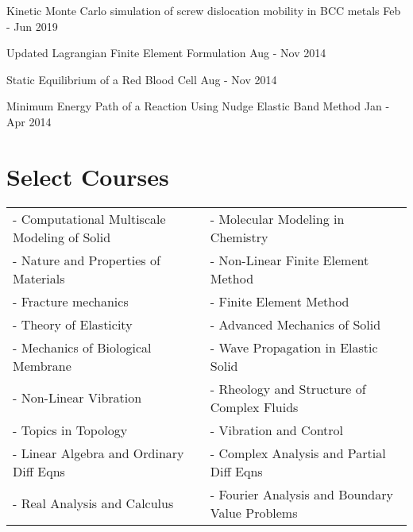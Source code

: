 \documentclass[margin,line]{resume}
\begin{document}
\begin{resume}
    Kinetic Monte Carlo simulation of screw dislocation mobility in BCC metals  \hfill \small{Feb - Jun 2019}

    \vspace{-0.3cm}
    Updated Lagrangian Finite Element Formulation  \hfill \small{Aug - Nov 2014}

    \vspace{-0.3cm}
    Static Equilibrium of a Red Blood Cell \hfill \small{Aug - Nov 2014}

    \vspace{-0.3cm}
    Minimum Energy Path of a Reaction Using Nudge Elastic Band Method \hfill \small{Jan - Apr 2014}




    \section{\mysidestyle Select Courses}

    \begin{tabular}{@{}p{7.5cm}p{7.5cm}}
        - Computational Multiscale Modeling of Solid & - Molecular Modeling in Chemistry              \\
        - Nature and Properties of Materials         & -  Non-Linear Finite Element Method            \\
        - Fracture mechanics                         & - Finite Element Method                        \\
        - Theory of Elasticity                       & - Advanced Mechanics of Solid                  \\
        - Mechanics of Biological Membrane           & - Wave Propagation in Elastic Solid            \\
        - Non-Linear Vibration                       & -	Rheology and Structure of Complex Fluids      \\
        - Topics in Topology                         & - Vibration and Control                        \\
        - Linear Algebra and Ordinary Diff Eqns      & - Complex Analysis and Partial Diff Eqns       \\
        - Real Analysis and Calculus                 & - Fourier Analysis and Boundary Value Problems
    \end{tabular}


\end{resume}
\end{document}
